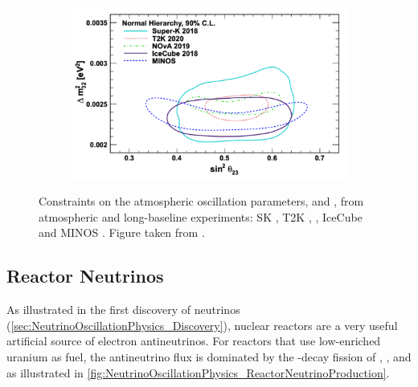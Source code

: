 \begin{figure}[h]
  \begin{subfigure}[t]{0.90\textwidth}
    \includegraphics[width=\textwidth, trim={0mm 0mm 0mm 0mm}, clip,page=1]{Figures/Theory/AtmosphericParams.pdf}
  \end{subfigure}
  \caption{Constraints on the atmospheric oscillation parameters,  and , from atmospheric and long-baseline experiments: SK \cite{Kamiokande_Collaboration2017-nf}, T2K \cite{T2K_Collaboration2018-sm},  \cite{Acero2019-rw}, IceCube \cite{Aartsen2018-cz} and MINOS \cite{Adamson2014-tt}. Figure taken from \cite{Athar_2022}.}
  \label{fig:NeutrinoOscillationPhysics_AtmosphericParamContour}
\end{figure}

\subsection{Reactor Neutrinos}
\label{subsec:NeutrinoOscillationPhysics_ReactorNeutrinos}

As illustrated in the first discovery of neutrinos (\autoref{sec:NeutrinoOscillationPhysics_Discovery}), nuclear reactors are a very useful artificial source of electron antineutrinos. For reactors that use low-enriched uranium  as fuel, the antineutrino flux is dominated by the \quickmath{\beta}-decay fission of , ,  and  \cite{Kim2013-ye} as illustrated in \autoref{fig:NeutrinoOscillationPhysics_ReactorNeutrinoProduction}.


